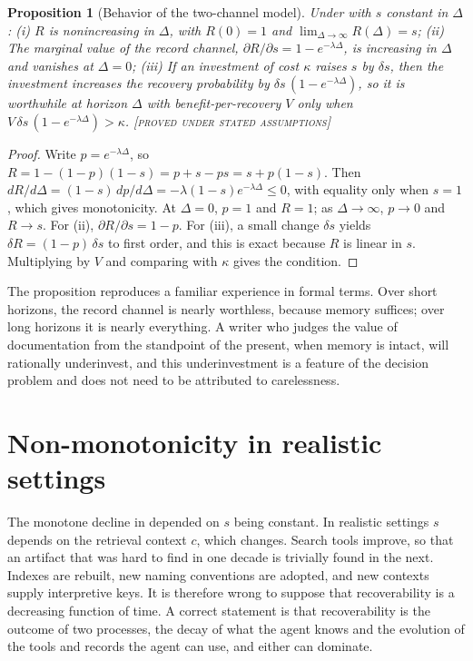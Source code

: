 \documentclass[11pt,twoside,openright]{book}
\theoremstyle{plain}
\newtheorem{proposition}[theorem]{Proposition}
\theoremstyle{definition}
\theoremstyle{remark}
\newcommand{\Proved}{\textup{\textsc{[proved under stated assumptions]}}}
\begin{document}
\begin{proposition}[Behavior of the two-channel model]\label{prop:twochannel}
Under  with $s$ constant in $\Delta$:
(i) $R$ is nonincreasing in $\Delta$, with $R(0)=1$ and $\lim_{\Delta\to\infty}R(\Delta)=s$; (ii) The marginal value of the record channel, $\partial R/\partial s=1-e^{-\lambda\Delta}$, is increasing in $\Delta$ and vanishes at $\Delta=0$; (iii) If an investment of cost $\kappa$ raises $s$ by $\delta s$, then the investment increases the recovery probability by $\delta s\,(1-e^{-\lambda\Delta})$, so it is worthwhile at horizon $\Delta$ with benefit-per-recovery $V$ only when $V\,\delta s\,(1-e^{-\lambda\Delta})>\kappa$.
\Proved{}
\end{proposition}

\begin{proof}
Write $p=e^{-\lambda\Delta}$, so $R=1-(1-p)(1-s)=p+s-ps=s+p(1-s)$. Then $dR/d\Delta=(1-s)\,dp/d\Delta=-\lambda(1-s)e^{-\lambda\Delta}\le 0$, with equality only when $s=1$, which gives monotonicity. At $\Delta=0$, $p=1$ and $R=1$; as $\Delta\to\infty$, $p\to0$ and $R\to s$. For (ii), $\partial R/\partial s=1-p$. For (iii), a small change $\delta s$ yields $\delta R=(1-p)\,\delta s$ to first order, and this is exact because $R$ is linear in $s$. Multiplying by $V$ and comparing with $\kappa$ gives the condition.
\end{proof}

The proposition reproduces a familiar experience in formal terms. Over short horizons, the record channel is nearly worthless, because memory suffices; over long horizons it is nearly everything. A writer who judges the value of documentation from the standpoint of the present, when memory is intact, will rationally underinvest, and this underinvestment is a feature of the decision problem and does not need to be attributed to carelessness.

\section{Non-monotonicity in realistic settings}

The monotone decline in  depended on $s$ being constant. In realistic settings $s$ depends on the retrieval context $c$, which changes. Search tools improve, so that an artifact that was hard to find in one decade is trivially found in the next. Indexes are rebuilt, new naming conventions are adopted, and new contexts supply interpretive keys. It is therefore wrong to suppose that recoverability is a decreasing function of time. A correct statement is that recoverability is the outcome of two processes, the decay of what the agent knows and the evolution of the tools and records the agent can use, and either can dominate.
\end{document}
